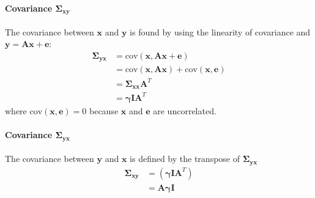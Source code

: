 \paragraph{Covariance $\boldsymbol{\Sigma}_{\mathbf{xy}}$}
The covariance between $\mathbf{x}$ and $\mathbf{y}$ is found by using the linearity of covariance and $\mathbf{y} = \mathbf{Ax} + \mathbf{e}$:
\begin{align*}
\boldsymbol{\Sigma}_{\mathbf{yx}} &= \text{cov} \left(\mathbf{x} , \mathbf{Ax} + \mathbf{e} \right) \\ 
&= \text{cov} \left(\mathbf{x} , \mathbf{Ax} \right) + \text{cov} \left(\mathbf{x} , \mathbf{e} \right) \\
&= \boldsymbol{\Sigma}_{\mathbf{xx}} \mathbf{A}^T \\
&= \boldsymbol{\gamma} \mathbf{I} \mathbf{A}^T
\end{align*}
where $\text{cov} \left(\mathbf{x} , \mathbf{e} \right) = 0$ because $\textbf{x}$ and $\textbf{e}$ are uncorrelated.

\paragraph{Covariance $\boldsymbol{\Sigma}_{\mathbf{yx}}$}
The covariance between $\mathbf{y}$ and $\mathbf{x}$ is defined by the transpose of $\boldsymbol{\Sigma}_{\mathbf{yx}}$
\begin{align*}
\boldsymbol{\Sigma}_{\mathbf{xy}} &= \left( \boldsymbol{\gamma} \mathbf{I} \mathbf{A}^T\right)\\
&= \textbf{A}\boldsymbol{\gamma}\mathbf{I}
\end{align*}

